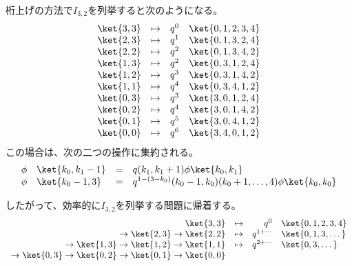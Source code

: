 {	桁上げの方法で$I_{3,2}$を列挙すると次のようになる。
	\begin{equation*}\begin{array}{rcrl}
		\ket{3,3} &\mapsto& q^0 & \ket{0,1,2,3,4} \\
		\ket{2,3} &\mapsto& q^1 & \ket{0,1,3,2,4} \\
		\ket{2,2} &\mapsto& q^2 & \ket{0,1,3,4,2} \\
		\ket{1,3} &\mapsto& q^2 & \ket{0,3,1,2,4} \\
		\ket{1,2} &\mapsto& q^3 & \ket{0,3,1,4,2} \\
		\ket{1,1} &\mapsto& q^4 & \ket{0,3,4,1,2} \\
		\ket{0,3} &\mapsto& q^3 & \ket{3,0,1,2,4} \\
		\ket{0,2} &\mapsto& q^4 & \ket{3,0,1,4,2} \\
		\ket{0,1} &\mapsto& q^5 & \ket{3,0,4,1,2} \\
		\ket{0,0} &\mapsto& q^6 & \ket{3,4,0,1,2} \\
	\end{array}\end{equation*}
	この場合は、次の二つの操作に集約される。
	\begin{equation*}\begin{array}{rlcl}
		\phi & \ket{k_0,k_1-1} &=& q(k_1,k_1+1)\phi\ket{k_0,k_1} \\
		\phi & \ket{k_0-1,3} &=& q^{1-(3-k_0)}(k_0-1,k_0)(k_0+1,\dots,4)
		\phi\ket{k_0,k_0} \\
	\end{array}\end{equation*}


	したがって、効率的に$I_{3,2}$を列挙する問題に帰着する。
	\begin{equation*}\begin{array}{rcrl}
		\ket{3,3} &\mapsto& q^0 & \ket{0,1,2,3,4} \\
		\to \ket{2,3} \to \ket{2,2} &\mapsto&
			q^{1+\cdots} & \ket{0,1,3,\dots} \\
		\to \ket{1,3} \to \ket{1,2} \to \ket{1,1} &\mapsto&
			q^{2+\cdots} & \ket{0,3,\dots} \\
		\to \ket{0,3} \to \ket{0,2} \to \ket{0,1} \to \ket{0,0} \\
	\end{array}\end{equation*}
}
